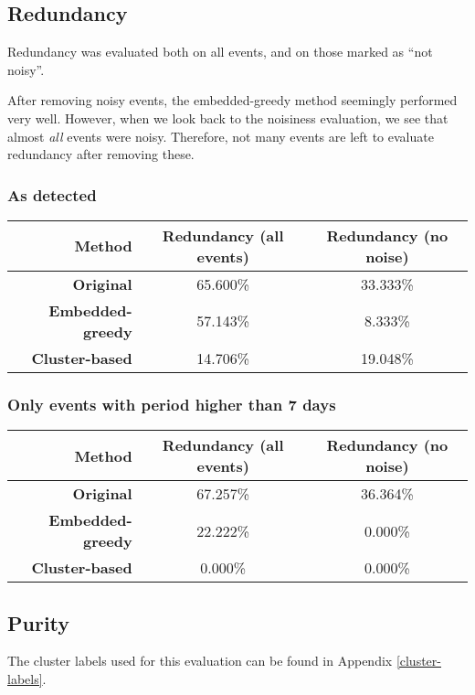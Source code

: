 \documentclass[a4paper]{article}
\begin{document}
\subsection{Redundancy} \label{redundancy}
Redundancy was evaluated both on all events, and on those marked as ``not noisy''.

After removing noisy events, the embedded-greedy method seemingly performed very well. However, when we look back to the noisiness evaluation, we see that almost \textit{all} events were noisy. Therefore, not many events are left to evaluate redundancy after removing these.

\subsubsection{As detected}
\begin{center}
\begin{tabular}{r c c} \toprule[1.5pt]
\bf Method & \bf Redundancy (all events) & \bf Redundancy (no noise) \\ \midrule
\bf Original & 65.600\% & 33.333\% \\
\bf Embedded-greedy & 57.143\% & 8.333\% \\
\bf Cluster-based & 14.706\% & 19.048\% \\ \bottomrule[1.25pt]
\end{tabular}
\end{center}

\subsubsection{Only events with period higher than 7 days}
\begin{center}
\begin{tabular}{r c c} \toprule[1.5pt]
\bf Method & \bf Redundancy (all events) & \bf Redundancy (no noise) \\ \midrule
\bf Original & 67.257\% & 36.364\% \\
\bf Embedded-greedy & 22.222\% & 0.000\% \\
\bf Cluster-based & 0.000\% & 0.000\% \\ \bottomrule[1.25pt]
\end{tabular}
\end{center}

\subsection{Purity}
The cluster labels used for this evaluation can be found in Appendix \ref{cluster-labels}.
\end{document}
